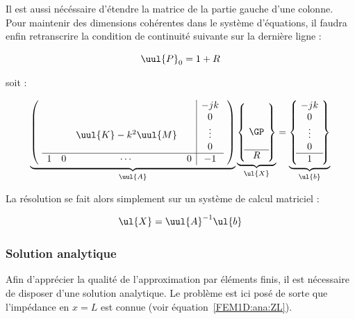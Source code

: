 Il est aussi nécéssaire d'étendre la matrice de la partie gauche d'une colonne. Pour maintenir des dimensions cohérentes
dans le système d'équations, il faudra enfin retranscrire la condition de continuité suivante sur la dernière ligne :

\begin{equation*}
	\uul{P}_0 = 1 + R
\end{equation*}

soit :

\begin{equation}
	\underbrace{\left(~
	\begin{array}{cccc|c}
		&&&&-jk\\
		&&&&0\\
		& & \uul{K} - k^2\uul{M} & &\vdots \\
		&&&&0\\\hline
			1 & 0 & \cdots & 0& -1 \\
	\end{array}
	~\right)}_{\uul{A}}
	\underbrace{\left\{~
	\begin{matrix}
		\\
		\\
		\GP\\
		\\\hline
		R
	\end{matrix}
	~\right\}}_{\ul{X}} = 
	\underbrace{\left\{~
	\begin{matrix}
		-jk\\
		0\\
		\vdots\\
		0\\\hline
		1
	\end{matrix}
	~\right\}}_{\ul{b}}
\end{equation}

La résolution se fait alors simplement sur un système de calcul matriciel :

\begin{equation*}
	\ul{X} = \uul{A}^{-1}\ul{b}
\end{equation*}

\subsubsection{Solution analytique}

Afin d'apprécier la qualité de l'approximation par éléments finis, il est nécessaire de disposer d'une solution
analytique. Le problème est ici posé de sorte que l'impédance en $x=L$ est connue (voir équation~\eqref{FEM1D:ana:ZL}).

